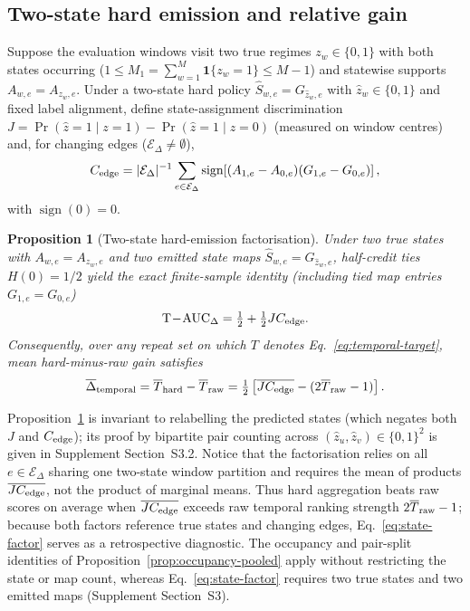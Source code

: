\documentclass[11pt]{article}
\newcommand{\Tauc}{\mathrm{T\!-\!AUC}_{\Delta}}
\newtheorem{proposition}{Proposition}
\begin{document}
\subsection{Two-state hard emission and relative gain}
\label{sec:state-factor}
Suppose the evaluation windows visit two true regimes $z_w\in\{0,1\}$ with both
states occurring ($1\le M_1=\sum_{w=1}^M \mathbf1\{z_w=1\}\le M-1$) and statewise
supports $A_{w,e}=A_{z_w,e}$. Under a two-state hard policy $\widehat S_{w,e}=G_{\widehat z_w,e}$
with $\widehat z_w\in\{0,1\}$ and fixed label alignment, define state-assignment
discrimination $J=\Pr(\widehat z=1\mid z=1)-\Pr(\widehat z=1\mid z=0)$ (measured
on window centres) and, for changing edges ($\mathcal E_\Delta\neq\emptyset$),
\begin{equation}
C_{\rm edge}=|\mathcal E_\Delta|^{-1}
\sum_{e\in\mathcal E_\Delta}
\operatorname{sign}\!\left[(A_{1,e}-A_{0,e})(G_{1,e}-G_{0,e})\right],
\end{equation}
with $\operatorname{sign}(0)=0$.

\begin{proposition}[Two-state hard-emission factorisation]
\label{prop:two-state-factor}
Under two true states with $A_{w,e}=A_{z_w,e}$ and two emitted state maps
$\widehat S_{w,e}=G_{\widehat z_w,e}$, half-credit ties $H(0)=1/2$ yield the
exact finite-sample identity (including tied map entries $G_{1,e}=G_{0,e}$)
\begin{equation}
\Tauc=\tfrac12+\tfrac12 J C_{\rm edge}.
\label{eq:state-factor}
\end{equation}
Consequently, over any repeat set on which $T$ denotes
Eq.~\eqref{eq:temporal-target}, mean hard-minus-raw gain satisfies
\begin{equation}
\overline\Delta_{\rm temporal}
=\overline T_{\rm hard}-\overline T_{\rm raw}
=\tfrac12\left[\overline{JC_{\rm edge}}
-(2\overline T_{\rm raw}-1)\right].
\label{eq:temporal-gain-factor}
\end{equation}
\end{proposition}

Proposition~\ref{prop:two-state-factor} is invariant to relabelling the
predicted states (which negates both $J$ and $C_{\rm edge}$); its proof by
bipartite pair counting across $(\widehat z_u,\widehat z_v)\in\{0,1\}^2$ is
given in Supplement Section~S3.2. Notice that the factorisation relies on all
$e\in\mathcal E_\Delta$ sharing one two-state window partition and requires the
mean of products $\overline{JC_{\rm edge}}$, not the product of marginal means.
Thus hard aggregation beats raw scores on average when $\overline{JC_{\rm edge}}$
exceeds raw temporal ranking strength $2\overline T_{\rm raw}-1$; because both
factors reference true states and changing edges, Eq.~\eqref{eq:state-factor}
serves as a retrospective diagnostic. The occupancy and pair-split identities of
Proposition~\ref{prop:occupancy-pooled} apply without restricting the state or
map count, whereas Eq.~\eqref{eq:state-factor} requires two true states and two
emitted maps (Supplement Section~S3).
\end{document}
